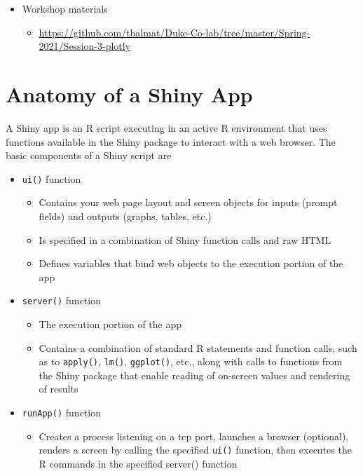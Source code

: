 \documentclass[10pt, letterpaper]{article}
\begin{document}
\begin{spacing}{1.0}
\begin{itemize}
  \item Workshop materials
    \begin{itemize}
        \item \url{https://github.com/tbalmat/Duke-Co-lab/tree/master/Spring-2021/Session-3-plotly}
    \end{itemize}
\end{itemize}


\section{Anatomy of a Shiny App}\label{sec:anatomyofapp}

A Shiny app is an R script executing in an active R environment that uses functions available in the Shiny package to interact with a web browser.  The basic components of a Shiny script are

\begin{itemize}
    \item \texttt{ui()} function
    \begin{itemize}
        \item Contains your web page layout and screen objects for inputs (prompt fields) and outputs (graphs, tables, etc.)
        \item Is specified in a combination of Shiny function calls and raw HTML
        \item Defines variables that bind web objects to the execution portion of the app
    \end{itemize}
    \item \texttt{server()} function
    \begin{itemize}
        \item The execution portion of the app
        \item Contains a combination of standard R statements and function calls, such as to \texttt{apply()}, \texttt{lm()}, \texttt{ggplot()}, etc., along with calls to functions from the Shiny package that enable reading of on-screen values and rendering of results
    \end{itemize}
    \item \texttt{runApp()} function
    \begin{itemize}
        \item Creates a process listening on a tcp port, launches a browser (optional), renders a screen by calling the specified \texttt{ui()} function, then executes the R commands in the specified server() function
    \end{itemize}
\end{itemize}


\end{spacing}
\end{document}
